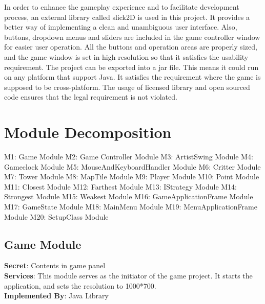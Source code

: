 \documentclass[12,english]{article}
\begin{document}
In order to enhance the gameplay experience and to facilitate development process, an external library called slick2D is used in this project. It provides a better way of implementing a clean and unambiguous user interface. Also, buttons, dropdown menus and sliders are included in the game controller window for easier user operation. All the buttons and operation areas are properly sized, and the game window is set in high resolution so that it satisfies the usability requirement. The project can be exported into a jar file. This means it could run on any platform that support Java. It satisfies the requirement where the game is supposed to be cross-platform. The usage of licensed library and open sourced code ensures that the legal requirement is not violated. 


\section{Module Decomposition}
M1: Game Module \newline    
M2: Game Controller Module \newline 
M3: ArtistSwing Module \newline 
M4: Gameclock Module \newline 
M5: MouseAndKeyboardHandler Module \newline 
M6: Critter Module \newline 
M7: Tower Module \newline 
M8: MapTile Module \newline 
M9: Player Module \newline 
M10: Point Module \newline 
M11: Closest Module \newline 
M12: Farthest Module \newline 
M13: IStrategy Module \newline 
M14: Strongest Module \newline 
M15: Weakest Module \newline 
M16: GameApplicationFrame Module \newline 
M17: GameState Module \newline 
M18: MainMenu Module \newline 
M19: MenuApplicationFrame Module \newline 
M20: SetupClass Module \newline 


	\subsection{Game Module}
	\textbf{Secret}: Contents in game panel \\
	\textbf{Services}: This module serves as the initiator of the game project. It starts the application, and sets the resolution to 1000*700. \\
	\textbf{Implemented By}: Java Library
	
\end{document}
